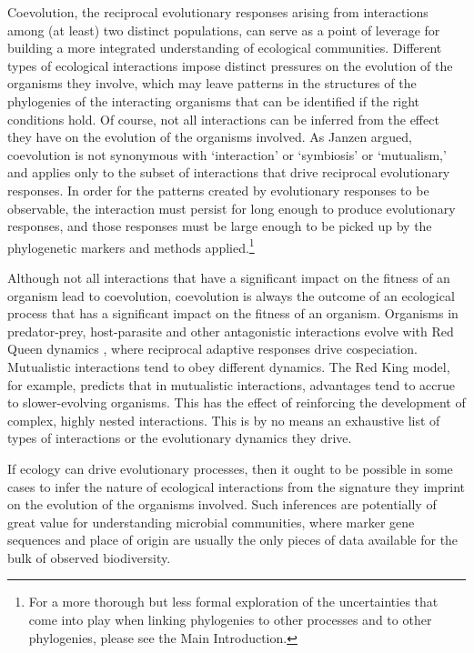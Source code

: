 Coevolution, the reciprocal evolutionary responses arising from interactions among (at least) two distinct populations, can serve as a point of leverage for building a more integrated understanding of ecological communities. Different types of ecological interactions impose distinct pressures on the evolution of the organisms they involve, which may leave patterns in the structures of the phylogenies of the interacting organisms that can be identified if the right conditions hold. \cite{gibson2015phylogenetic, bergstrom2003red, gokhale2012mutualism} Of course, not all interactions can be inferred from the effect they have on the evolution of the organisms involved. As Janzen argued, coevolution is not synonymous with `interaction' or `symbiosis' or `mutualism,' and applies only to the subset of interactions that drive reciprocal evolutionary responses. \cite{janzen1980coevolution} In order for the patterns created by evolutionary responses to be observable, the interaction must persist for long enough to produce evolutionary responses, and those responses must be large enough to be picked up by the phylogenetic markers and methods applied.\footnote{For a more thorough but less formal exploration of the uncertainties that come into play when linking phylogenies to other processes and to other phylogenies, please see the Main Introduction.}

Although not all interactions that have a significant impact on the fitness of an organism lead to coevolution, coevolution is always the outcome of an ecological process that has a significant impact on the fitness of an organism. Organisms in predator-prey, host-parasite and other antagonistic interactions evolve with Red Queen dynamics \cite{van1973new, gibson2015phylogenetic}, where reciprocal adaptive responses drive cospeciation. Mutualistic interactions tend to obey different dynamics. The Red King model, \cite{bergstrom2003red, gokhale2012mutualism} for example, predicts that in mutualistic interactions, advantages tend to accrue to slower-evolving organisms. This has the effect of reinforcing the development of complex, highly nested interactions. \cite{bastolla2009architecture, rezende2007non} This is by no means an exhaustive list of types of interactions or the evolutionary dynamics they drive. 

If ecology can drive evolutionary processes, then it ought to be possible in some cases to infer the nature of ecological interactions from the signature they imprint on the evolution of the organisms involved. Such inferences are potentially of great value for understanding microbial communities, where marker gene sequences and place of origin are usually the only pieces of data available for the bulk of observed biodiversity.

